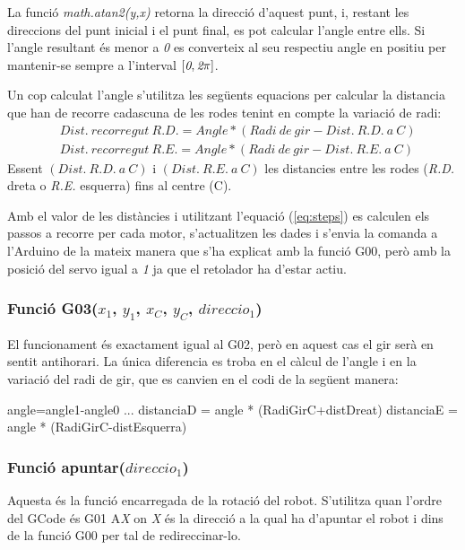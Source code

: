 La funció \emph{math.atan2(y,x)} retorna la direcció d’aquest punt, i, restant les direccions del punt inicial i el punt final, es pot calcular l'angle entre ells. Si l’angle resultant és menor a \emph{0} es converteix al seu respectiu angle en positiu per mantenir-se sempre a l’interval $[\emph{0},\emph{2} \pi]$.

Un cop calculat l’angle s’utilitza les següents equacions per calcular la distancia que han de recorre cadascuna de les rodes tenint en compte la variació de radi:
\begin{eqnarray}
\nonumber &Dist. \ recorregut \ R.D. = Angle * (Radi \ de \ gir-Dist. \ R.D. \ a \ C) \\ 
&Dist. \ recorregut \ R.E. = Angle * (Radi \ de \ gir-Dist. \ R.E. \ a \ C)
\end{eqnarray}
Essent  $(Dist. \ R.D. \ a \ C)$ i $(Dist. \ R.E. \ a \ C)$ les distancies entre les rodes (\emph{R.D.} dreta o \emph{R.E.} esquerra) fins al centre (C).

Amb el valor de les distàncies i utilitzant l’equació (\ref{eq:steps}) es calculen els passos a recorre per cada motor, s’actualitzen les dades i s’envia la comanda a l’Arduino de la mateix manera que s’ha explicat amb la funció G00, però amb la posició del servo igual a \emph{1} ja que el retolador ha d’estar actiu. 

\subsubsection{Funció G03($x_{1}$, $y_{1}$, $x_{C}$, $y_{C}$, $direccio_{1}$)}
El funcionament és exactament igual al G02, però en aquest cas el gir serà en sentit antihorari. La única diferencia es troba en el càlcul de l’angle i en la variació del radi de gir, que es canvien en el codi de la següent manera: 

\begin{python}
	angle=angle1-angle0
	...
	distanciaD = angle * (RadiGirC+distDreat) 
	distanciaE = angle * (RadiGirC-distEsquerra)
\end{python}
	
\subsubsection{Funció apuntar($direccio_{1}$)}\label{apuntar}

Aquesta és la funció encarregada de la rotació del robot. S’utilitza quan l’ordre del GCode és G01 A\emph{X} on \emph{X} és la direcció a la qual ha d’apuntar el robot i dins de la funció G00 per tal de redireccinar-lo. 

